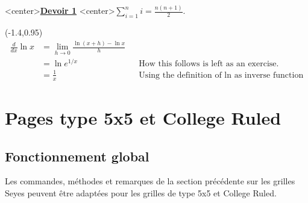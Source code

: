 \documentclass[a4paper]{article}
\begin{document}
\begin{PleinePageSeyes}[NumLignes]%
	\LignePapierSeyes[Echelle=1.5,Ligne=2,Couleur=red]<center>{\underline{\cursive\bfseries Devoir 1}}
	\ParagraphePapierSeyes[Ligne=10]{\cursive\lipsum[1]}
	\LignePapierSeyes[Ligne=25]<center>{${\displaystyle\sum_{i=1}^{n} i=\displaystyle\frac{n(n+1)}{2}}$.}
	
	\LignePapierSeyes[Echelle=1.1,Ligne=27](-1.4,0.95)
	{
		\begin{align*}
			\frac{d}{dx} \ln x &= \lim_{h\to 0} \frac{\ln(x+h) - \ln x}{h} \\
			&= \ln e^{1/x} &&\text{How this follows is left as an exercise.}\\
			&= \frac{1}{x} &&\text{Using the definition of ln as inverse function}
		\end{align*}
	}
\end{PleinePageSeyes}

\pagebreak

\section{Pages type 5x5 et College Ruled}

\subsection{Fonctionnement global}

Les commandes, méthodes et remarques de la section précédente sur les grilles Seyes peuvent être adaptées pour les grilles de type 5x5 et College Ruled.
\end{document}
